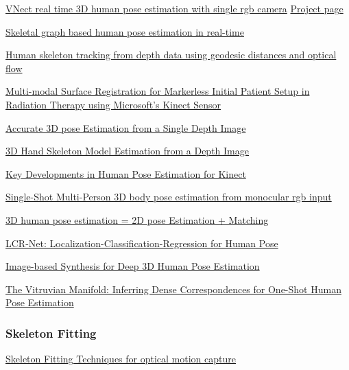 \href{https://arxiv.org/pdf/1705.01583.pdf}{VNect real time 3D human pose estimation with single rgb camera}
\href{http://gvv.mpi-inf.mpg.de/projects/VNect/}{Project page}

\href{http://www.reactivereality.com/static/pdf/paper69.pdf}{Skeletal graph based human pose estimation in real-time}

\href{https://www.sciencedirect.com/science/article/pii/S026288561100134X}{Human skeleton tracking from depth data using geodesic distances and optical flow}

\href{http://citeseerx.ist.psu.edu/viewdoc/download?doi=10.1.1.642.3647&rep=rep1&type=pdf}{Multi-modal Surface Registration for Markerless Initial Patient Setup in Radiation Therapy using Microsoft’s Kinect Sensor}

\href{https://ieeexplore.ieee.org/stamp/stamp.jsp?tp=&arnumber=6126310&tag=1}{Accurate 3D pose Estimation from a Single Depth Image}

\href{http://www.mva-org.jp/Proceedings/2015USB/papers/14-18.pdf}{3D Hand Skeleton Model Estimation from a Depth Image}

\href{https://www.microsoft.com/en-us/research/wp-content/uploads/2016/02/ks_book_2012.pdf}{Key Developments in Human Pose Estimation for Kinect}

\href{https://arxiv.org/pdf/1712.03453.pdf}{Single-Shot Multi-Person 3D body pose estimation from monocular rgb input}

\href{https://arxiv.org/pdf/1612.06524.pdf}{3D human pose estimation = 2D pose Estimation + Matching}

\href{https://hal.inria.fr/hal-01505085/document}{LCR-Net: Localization-Classification-Regression for Human Pose}

\href{https://arxiv.org/pdf/1802.04216.pdf}{Image-based Synthesis for Deep 3D Human Pose Estimation}

\href{http://www.cs.toronto.edu/~jtaylor/papers/cvpr2012.pdf}{The Vitruvian Manifold: Inferring Dense Correspondences for One-Shot Human Pose Estimation}



\subsubsection{Skeleton Fitting}

\href{https://pdfs.semanticscholar.org/8492/075b6d9ed4a3065849d0b0eb7a705a5112b9.pdf}{Skeleton Fitting Techniques for optical motion capture}

